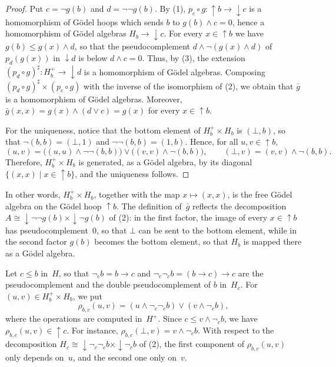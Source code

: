 \documentclass[reqno,a4paper]{amsart}
\theoremstyle{plain}
\theoremstyle{definition}
\theoremstyle{remark}
\numberwithin{equation}{section}
\newcommand{\up}{{\uparrow}}
\newcommand{\down}{{\downarrow}}
\begin{document}
\begin{proof}
Put $c=\neg g(b)$ and $d=\neg\neg g(b)$. By (1), $p_c\circ g\colon{\up}b\to{\down}c$ is a homomorphism of G\"odel hoops which sends $b$ to $g(b)\wedge c=0$, hence a homomorphism of G\"odel algebras $H_b\to{\down}c$. For every $x\in{\up}b$ we have $g(b)\leq g(x)\wedge d$, so that the pseudocomplement $d\wedge\neg(g(x)\wedge d)$ of $p_d(g(x))$ in ${\down}d$ is below $d\wedge c=0$. Thus, by (3), the extension $(p_d\circ g)^\sharp\colon H_b^+\to{\down}d$ is a homomorphism of G\"odel algebras. Composing $(p_d\circ g)^\sharp\times(p_c\circ g)$ with the inverse of the isomorphism of (2), we obtain that $\bar g$ is a homomorphism of G\"odel algebras. Moreover, $\bar g(x,x)=g(x)\wedge(d\vee c)=g(x)$ for every $x\in{\up}b$.

For the uniqueness, notice that the bottom element of $H_b^+\times H_b$ is $(\bot,b)$, so that $\neg(b,b)=(\bot,1)$ and $\neg\neg(b,b)=(1,b)$. Hence, for all $u,v\in{\up}b$,
\begin{equation}\label{EqGenerators}
(u,v)=\bigl((u,u)\wedge\neg\neg(b,b)\bigr)\vee\bigl((v,v)\wedge\neg(b,b)\bigr),\qquad(\bot,v)=(v,v)\wedge\neg(b,b).
\end{equation}
Therefore, $H_b^+\times H_b$ is generated, as a G\"odel algebra, by its diagonal $\{(x,x)\mid x\in{\up}b\}$, and the uniqueness follows.
\end{proof}

In other words, $H_b^+\times H_b$, together with the map $x\mapsto(x,x)$, is the free G\"odel algebra on the G\"odel hoop ${\up}b$. The definition of~$\bar g$ reflects the decomposition $A\cong{\down}\neg\neg g(b)\times{\down}\neg g(b)$ of (2): in the first factor, the image of every $x\in{\up}b$ has pseudocomplement~$0$, so that $\bot$ can be sent to the bottom element, while in the second factor $g(b)$ becomes the bottom element, so that $H_b$ is mapped there as a G\"odel algebra.

Let $c\leq b$ in~$H$, so that $\neg_c b=b\to c$ and $\neg_c\neg_c b=(b\to c)\to c$ are the pseudocomplement and the double pseudocomplement of $b$ in~$H_c$. For $(u,v)\in H_b^+\times H_b$, we put
\begin{equation}\label{EqRho}
\rho_{b,c}(u,v)=(u\wedge\neg_c\neg_c b)\vee(v\wedge\neg_c b),
\end{equation}
where the operations are computed in~$H^+$. Since $c\leq v\wedge\neg_c b$, we have $\rho_{b,c}(u,v)\in{\up}c$. For instance, $\rho_{b,c}(\bot,v)=v\wedge\neg_c b$. With respect to the decomposition $H_c\cong{\down}\neg_c\neg_c b\times{\down}\neg_c b$ of (2), the first component of $\rho_{b,c}(u,v)$ only depends on~$u$, and the second one only on~$v$.
\end{document}

